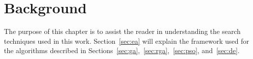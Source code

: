 \chapter{Background}

The purpose of this chapter is to assist the reader in understanding the search techniques used in this work. Section~\ref{sec:ea} will explain the framework used for the algorithms described in Sections~\ref{sec:ga},~\ref{sec:rga},~\ref{sec:pso}, and~\ref{sec:de}.







